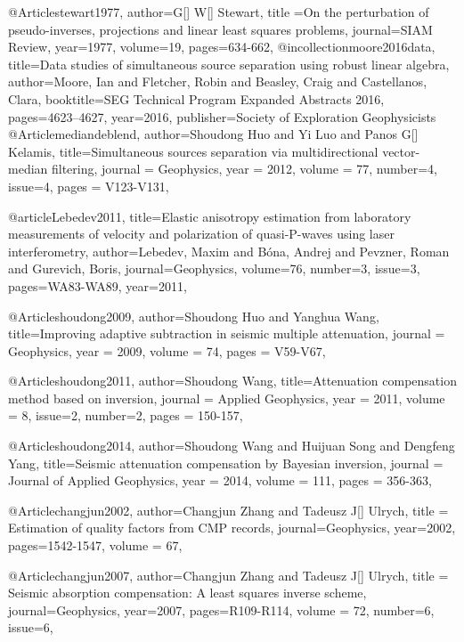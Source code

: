 @Article{stewart1977,
  author={G[] W[] Stewart},
  title ={On the perturbation of pseudo-inverses, projections and linear least squares problems},
  journal={SIAM Review},
  year=1977,
  volume=19,
  pages={634-662},
}
@incollection{moore2016data,
  title={Data studies of simultaneous source separation using robust linear algebra},
  author={Moore, Ian and Fletcher, Robin and Beasley, Craig and Castellanos, Clara},
  booktitle={SEG Technical Program Expanded Abstracts 2016},
  pages={4623--4627},
  year={2016},
  publisher={Society of Exploration Geophysicists}
}
@Article{mediandeblend,
  author={Shoudong Huo and Yi Luo and Panos G[] Kelamis},
  title={Simultaneous sources separation via multidirectional vector-median filtering},
  journal = 	 {Geophysics},
  year = 	 2012,
  volume =	 77,
  number=4,
  issue=4,
  pages =	 {V123-V131},
}

@article{Lebedev2011,
  title={Elastic anisotropy estimation from laboratory measurements of velocity and polarization of quasi-P-waves using laser interferometry},
  author={Lebedev, Maxim and Bóna, Andrej and Pevzner, Roman and Gurevich, Boris},
  journal={Geophysics},
  volume={76},
  number={3},
  issue=3,
  pages={WA83-WA89},
  year={2011},
}

@Article{shoudong2009,
  author={Shoudong Huo and Yanghua Wang},
  title={Improving adaptive subtraction in seismic multiple attenuation},
  journal = 	 {Geophysics},
  year = 	 2009,
  volume =	 74,
  pages =	 {V59-V67},
}

@Article{shoudong2011,
  author={Shoudong Wang},
  title={Attenuation compensation method based on inversion},
  journal = 	 {Applied Geophysics},
  year = 	 2011,
  volume =	 8,
  issue=2,
  number=2,
  pages =	 {150-157},
}

@Article{shoudong2014,
  author={Shoudong Wang and Huijuan Song and Dengfeng Yang},
  title={Seismic attenuation compensation by Bayesian inversion},
  journal = 	 {Journal of Applied Geophysics},
  year = 	 2014,
  volume =	 111,
  pages =	 {356-363},
}

@Article{changjun2002,
  author={Changjun Zhang and Tadeusz J[] Ulrych},
  title = {Estimation of quality factors from CMP records},
  journal={Geophysics},
  year=2002,
  pages={1542-1547},
  volume = 67,
}

@Article{changjun2007,
  author={Changjun Zhang and Tadeusz J[] Ulrych},
  title = {Seismic absorption compensation: A least squares inverse scheme},
  journal={Geophysics},
  year=2007,
  pages={R109-R114},
  volume = 72,
  number=6,
  issue=6,
}

